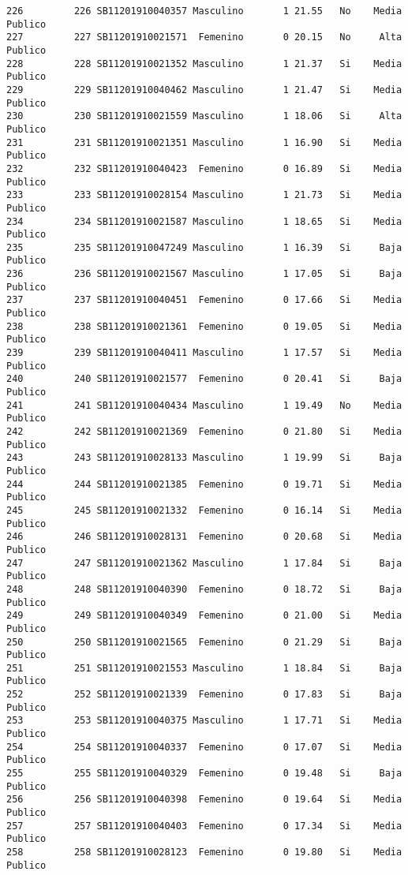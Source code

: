 \documentclass[
  letterpaper,
  DIV=11,
  numbers=noendperiod]{scrartcl}
\begin{document}
\begin{verbatim}
226         226 SB11201910040357 Masculino       1 21.55   No    Media Publico
227         227 SB11201910021571  Femenino       0 20.15   No     Alta Publico
228         228 SB11201910021352 Masculino       1 21.37   Si    Media Publico
229         229 SB11201910040462 Masculino       1 21.47   Si    Media Publico
230         230 SB11201910021559 Masculino       1 18.06   Si     Alta Publico
231         231 SB11201910021351 Masculino       1 16.90   Si    Media Publico
232         232 SB11201910040423  Femenino       0 16.89   Si    Media Publico
233         233 SB11201910028154 Masculino       1 21.73   Si    Media Publico
234         234 SB11201910021587 Masculino       1 18.65   Si    Media Publico
235         235 SB11201910047249 Masculino       1 16.39   Si     Baja Publico
236         236 SB11201910021567 Masculino       1 17.05   Si     Baja Publico
237         237 SB11201910040451  Femenino       0 17.66   Si    Media Publico
238         238 SB11201910021361  Femenino       0 19.05   Si    Media Publico
239         239 SB11201910040411 Masculino       1 17.57   Si    Media Publico
240         240 SB11201910021577  Femenino       0 20.41   Si     Baja Publico
241         241 SB11201910040434 Masculino       1 19.49   No    Media Publico
242         242 SB11201910021369  Femenino       0 21.80   Si    Media Publico
243         243 SB11201910028133 Masculino       1 19.99   Si     Baja Publico
244         244 SB11201910021385  Femenino       0 19.71   Si    Media Publico
245         245 SB11201910021332  Femenino       0 16.14   Si    Media Publico
246         246 SB11201910028131  Femenino       0 20.68   Si    Media Publico
247         247 SB11201910021362 Masculino       1 17.84   Si     Baja Publico
248         248 SB11201910040390  Femenino       0 18.72   Si     Baja Publico
249         249 SB11201910040349  Femenino       0 21.00   Si    Media Publico
250         250 SB11201910021565  Femenino       0 21.29   Si     Baja Publico
251         251 SB11201910021553 Masculino       1 18.84   Si     Baja Publico
252         252 SB11201910021339  Femenino       0 17.83   Si     Baja Publico
253         253 SB11201910040375 Masculino       1 17.71   Si    Media Publico
254         254 SB11201910040337  Femenino       0 17.07   Si    Media Publico
255         255 SB11201910040329  Femenino       0 19.48   Si     Baja Publico
256         256 SB11201910040398  Femenino       0 19.64   Si    Media Publico
257         257 SB11201910040403  Femenino       0 17.34   Si    Media Publico
258         258 SB11201910028123  Femenino       0 19.80   Si    Media Publico

\end{verbatim}
\end{document}

